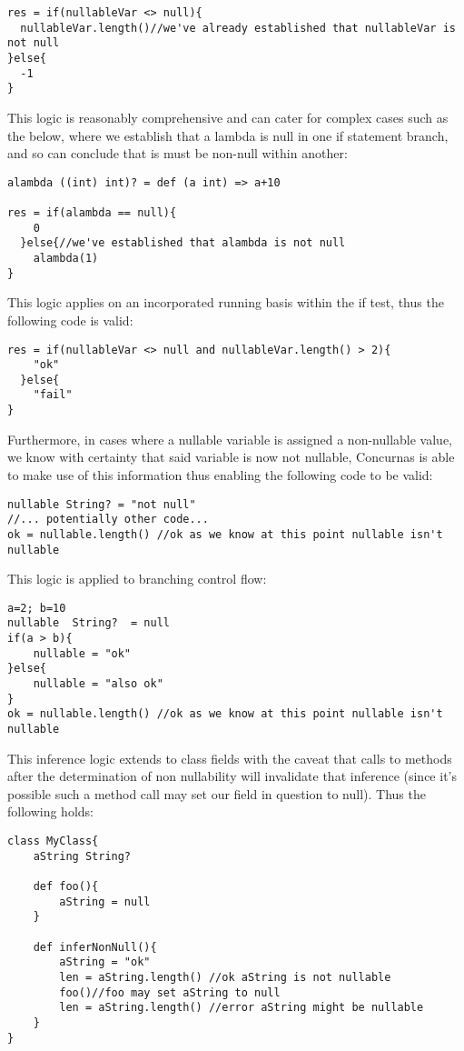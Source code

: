 \documentclass[conc-doc]{subfiles}
\begin{document}
\begin{lstlisting}
res = if(nullableVar <> null){
  nullableVar.length()//we've already established that nullableVar is not null
}else{
  -1
}
\end{lstlisting}

This logic is reasonably comprehensive and can cater for complex cases such as the below, where we establish that a lambda is null in one if statement branch, and so can conclude that is must be non-null within another:

\begin{lstlisting}
alambda ((int) int)? = def (a int) => a+10

res = if(alambda == null){
    0
  }else{//we've established that alambda is not null
	alambda(1)
}
\end{lstlisting}

This logic applies on an incorporated running basis within the if test, thus the following code is valid:

\begin{lstlisting}
res = if(nullableVar <> null and nullableVar.length() > 2){
    "ok"
  }else{
    "fail"
}
\end{lstlisting}


Furthermore, in cases where a nullable variable is assigned a non-nullable value, we know with certainty that said variable is now not nullable, Concurnas is able to make use of this information thus enabling the following code to be valid:

\begin{lstlisting}
nullable String? = "not null"
//... potentially other code...
ok = nullable.length() //ok as we know at this point nullable isn't nullable
\end{lstlisting}

This logic is applied to branching control flow:

\begin{lstlisting}
a=2; b=10
nullable  String?  = null
if(a > b){
	nullable = "ok"
}else{
	nullable = "also ok"
}
ok = nullable.length() //ok as we know at this point nullable isn't nullable
\end{lstlisting}

This inference logic extends to class fields with the caveat that calls to methods after the determination of non nullability will invalidate that inference (since it's possible such a method call may set our field in question to null). Thus the following holds:

\begin{lstlisting}
class MyClass{
	aString String?

	def foo(){ 
		aString = null
	}
	
	def inferNonNull(){
		aString = "ok"
		len = aString.length() //ok aString is not nullable
		foo()//foo may set aString to null
		len = aString.length() //error aString might be nullable
	}
}
\end{lstlisting}
\end{document}
